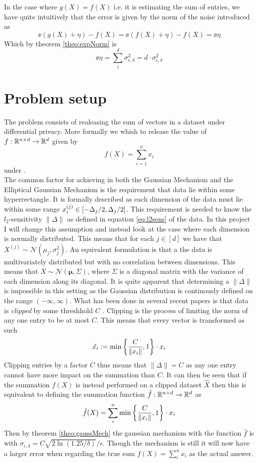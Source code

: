 \documentclass[a4paper,12pt]{article}
\begin{document}
In the case where $g(X) = f(X)$ i.e. it is estimating the sum
of entries, we have quite intuitively that the error is given by 
the norm of the noise introduced as
\[
    \ee{(g(X) + \eta) - f(X)} =
    \ee{(f(X) + \eta) - f(X)} = 
    \ee{\eta}
\]
Which by theorem \ref{theo:expNorm} is 
\[
    \ee{\eta} = \sum_i^d \sigma_{\epsilon,\delta}^2 = d \cdot \sigma_{\epsilon,\delta}^2
\]




\section{Problem setup}
The problem consists of realeasing the sum of vectors 
in a dataset under differential privacy.
More formally we whish to release the value of 
$f:\mathbb{R}^{n \times d} \rightarrow  \mathbb{R}^d$ given by
\[ f(X) = \sum_{i = 1}^n x_i  \] 
under \edp. \\
The common factor for achieving \edp in both the Gaussian Mechanism
and the Elliptical Gaussian Mechanism is the requirement that 
data lie within some hyperrectangle. It is formally described as 
each dimension of the data must lie within some range 
$ x^{(j)}_i \in \left [-\Delta_j/2, \Delta_j/2 \right] $. 
This requirement is needed to know the $l_2$-sensitivity $\| \Delta \|$ 
as defined in equation \ref{eq:l2sens} of the data.
In this project I will change this assumption and instead 
look at the case where each dimension is normally distributed.
This means that for each 
$ j \in [d] $ we have that 
$X^{(j)} \sim \mathcal{N}(\mu_j, \sigma_j^2)$.
An equivalent formulation is that a the data is 
multivariately distributed but with no correlation between dimensions.
This means that $X \sim \mathcal{N}(\bm{\mu}, \Sigma ) $, 
where $\Sigma$ is a diagonal matrix with the variance of each 
dimension along its diagonal.
It is quite apparent that determining a $ \| \Delta \|$ is impossible 
in this setting as the Gaussian distribution is continously defined 
on the range $ (-\infty, \infty)$. What has been done in several 
recent papers is that data is \textit{clipped} by some threshhold 
$C$ \cite{Huang2021,coinpress}. 
Clipping is the process of limiting the norm of any one entry 
to be at most $C$. This means that every vector is transformed as such
\[
    \hat{x_i} := \min \left \{\frac{C}{\| x_i \|}, 1\right\} \cdot x_i
\]
Clipping entries by a factor $C$ thus means that $\| \Delta \| = C $ 
as any one entry cannot have more impact on the summation than $C$.
It can then be seen that if the summation $f(X)$ is instead 
performed on a clipped dataset $\hat{X}$ then this is equivalent to
defining the summation function $\hat{f}: \mathbb{R}^{n \times d} \rightarrow \mathbb{R}^d$ as
\[
    \hat{f}(X) = \sum_i^n \min \left \{ \frac{C}{\| x_i \|}, 1\right\} \cdot x_i
    \]
Then by theorem \ref{theo:gaussMech} the 
gaussian mechanism with the function $\hat{f}$ is \edp with
$\sigma_{\epsilon, \delta} = C \sqrt{2 \ln (1.25/\delta)}/\epsilon$.
Though the mechanism is still \edp it will now have 
a larger error when regarding the true sum
$f(X) = \sum_i^n x_i$ as the actual answer.
\end{document}
